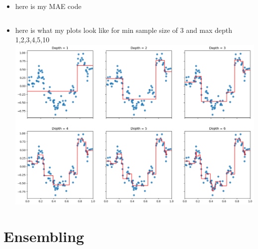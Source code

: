 \documentclass{article}
\theoremstyle{plain}
\theoremstyle{definition}
\begin{document}
\begin{enumerate}
 \begin{itemize}
           \color{blue}
               \item here is my MAE code \\
           \inputminted[firstline=298, lastline=311, breaklines=True]{python}{hw6.py}
           \item here is what my plots look like for min sample size of 3 and max depth 1,2,3,4,5,10 
           \\ \includegraphics[width=15cm]{homework/homework_6/images/hw6_3.png
           }
\end{itemize}


\setcounter{saveenum}{\value{enumi}}
\end{enumerate}

\section{Ensembling}
\end{document}
